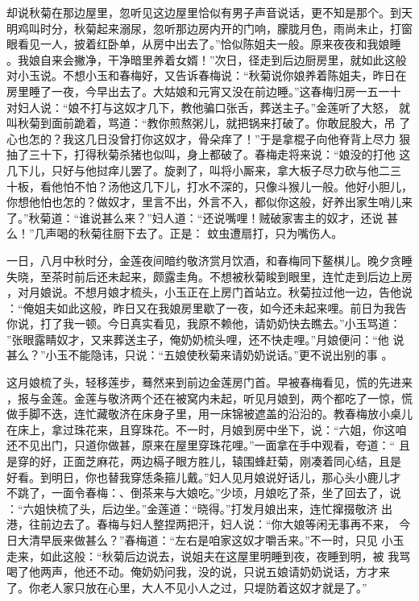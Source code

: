 却说秋菊在那边屋里，忽听见这边屋里恰似有男子声音说话，更不知是那个。到天
明鸡叫时分，秋菊起来溺尿，忽听那边房内开的门响，朦胧月色，雨尚未止，打窗
眼看见一人，披着红卧单，从房中出去了。”恰似陈姐夫一般。原来夜夜和我娘睡
。我娘自来会撇净，干净暗里养着女婿！”次日，径走到后边厨房里，就如此这般
对小玉说。不想小玉和春梅好，又告诉春梅说：“秋菊说你娘养着陈姐夫，昨日在
房里睡了一夜，今早出去了。大姑娘和元宵又没在前边睡。”这春梅归房一五一十
对妇人说：“娘不打与这奴才几下，教他骗口张舌，葬送主子。”金莲听了大怒，
就叫秋菊到面前跪着，骂道：“教你煎熬粥儿，就把锅来打破了。你敢屁股大，吊
了心也怎的？我这几日没曾打你这奴才，骨朵痒了！”于是拿棍子向他脊背上尽力
狠抽了三十下，打得秋菊杀猪也似叫，身上都破了。春梅走将来说：“娘没的打他
这几下儿，只好与他挝痒儿罢了。旋剥了，叫将小厮来，拿大板子尽力砍与他二三
十板，看他怕不怕？汤他这几下儿，打水不深的，只像斗猴儿一般。他好小胆儿，
你想他怕也怎的？做奴才，里言不出，外言不入，都似你这般，好养出家生哨儿来
了。”秋菊道：“谁说甚么来？”妇人道：“还说嘴哩！贼破家害主的奴才，还说
甚么！”几声喝的秋菊往厨下去了。正是：
蚊虫遭扇打，只为嘴伤人。

一日，八月中秋时分，金莲夜间暗约敬济赏月饮酒，和春梅同下鳌棋儿。晚夕贪睡
失晓，至茶时前后还未起来，颇露圭角。不想被秋菊睃到眼里，连忙走到后边上房
，对月娘说。不想月娘才梳头，小玉正在上房门首站立。秋菊拉过他一边，告他说
：“俺姐夫如此这般，昨日又在我娘房里歇了一夜，如今还未起来哩。前日为我告
你说，打了我一顿。今日真实看见，我原不赖他，请奶奶快去瞧去。”小玉骂道：
”张眼露睛奴才，又来葬送主子，俺奶奶梳头哩，还不快走哩。”月娘便问：“他
说甚么？”小玉不能隐讳，只说：“五娘使秋菊来请奶奶说话。”更不说出别的事
。

这月娘梳了头，轻移莲步，蓦然来到前边金莲房门首。早被春梅看见，慌的先进来
，报与金莲。金莲与敬济两个还在被窝内未起，听见月娘到，两个都吃了一惊，慌
做手脚不迭，连忙藏敬济在床身子里，用一床锦被遮盖的沿沿的。教春梅放小桌儿
在床上，拿过珠花来，且穿珠花。不一时，月娘到房中坐下，说：“六姐，你这咱
还不见出门，只道你做甚，原来在屋里穿珠花哩。”一面拿在手中观看，夸道：“
且是穿的好，正面芝麻花，两边槅子眼方胜儿，辕围蜂赶菊，刚凑着同心结，且是
好看。到明日，你也替我穿恁条箍儿戴。”妇人见月娘说好话儿，那心头小鹿儿才
不跳了，一面令春梅：、倒茶来与大娘吃。”少顷，月娘吃了茶，坐了回去了，说
：“六姐快梳了头，后边坐。”金莲道：“晓得。”打发月娘出来，连忙撺掇敬济
出港，往前边去了。春梅与妇人整捏两把汗，妇人说：“你大娘等闲无事再不来，
今日大清早辰来做甚么？”春梅道：“左右是咱家这奴才嚼舌来。”不一时，只见
小玉走来，如此这般：“秋菊后边说去，说姐夫在这屋里明睡到夜，夜睡到明，被
我骂喝了他两声，他还不动。俺奶奶问我，没的说，只说五娘请奶奶说话，方才来
了。你老人家只放在心里，大人不见小人之过，只堤防着这奴才就是了。”

